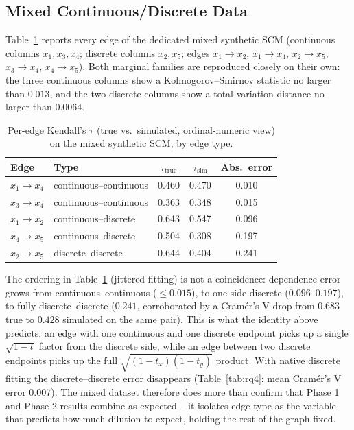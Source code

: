 \documentclass[
  english,
  class=report,
  accentcolor=2c,
  marginpar=false,
  parskip=half-,
  fontsize=11pt,
  ruledheaders=false,
  pdfa=false,
  IMRAD=false,
  thesis={type=master}
]{tudapub}
\begin{document}
\subsection{Mixed Continuous/Discrete Data}
Table~\ref{tab:mixed} reports every edge of the dedicated mixed synthetic
SCM (continuous columns $x_1, x_3, x_4$; discrete columns $x_2, x_5$; edges
$x_1{\to}x_2$, $x_1{\to}x_4$, $x_2{\to}x_5$, $x_3{\to}x_4$, $x_4{\to}x_5$).
Both marginal families are reproduced closely on their own: the three
continuous columns show a Kolmogorov--Smirnov statistic no larger than
$0.013$, and the two discrete columns show a total-variation distance no
larger than $0.0064$.

\begin{table}[ht]
\caption{Per-edge Kendall's $\tau$ (true vs.\ simulated, ordinal-numeric view) on the mixed synthetic SCM, by edge type.}
\label{tab:mixed}
\centering
\begin{tabular}{llccc}
\toprule
\textbf{Edge} & \textbf{Type} & \textbf{$\tau_{\text{true}}$} & \textbf{$\tau_{\text{sim}}$} & \textbf{Abs.\ error} \\
\midrule
$x_1 \to x_4$ & continuous--continuous & 0.460 & 0.470 & 0.010 \\
$x_3 \to x_4$ & continuous--continuous & 0.363 & 0.348 & 0.015 \\
$x_1 \to x_2$ & continuous--discrete   & 0.643 & 0.547 & 0.096 \\
$x_4 \to x_5$ & continuous--discrete   & 0.504 & 0.308 & 0.197 \\
$x_2 \to x_5$ & discrete--discrete     & 0.644 & 0.404 & 0.241 \\
\bottomrule
\end{tabular}
\end{table}

The ordering in Table~\ref{tab:mixed} (jittered fitting) is not a
coincidence: dependence error grows from continuous--continuous ($\le
0.015$), to one-side-discrete ($0.096$--$0.197$), to fully
discrete--discrete ($0.241$, corroborated by a Cram\'er's V drop from
$0.683$ true to $0.428$ simulated on the same pair). This is what the
identity above predicts: an edge with one continuous and one discrete
endpoint picks up a single $\sqrt{1-t}$ factor from the discrete side,
while an edge between two discrete endpoints picks up the full
$\sqrt{(1-t_x)(1-t_y)}$ product. With native discrete fitting the
discrete--discrete error disappears (Table~\ref{tab:rq4}: mean Cram\'er's V
error 0.007). The
mixed dataset therefore does more than confirm that Phase 1 and Phase 2
results combine as expected -- it isolates edge type as the variable that
predicts how much dilution to expect, holding the rest of the graph fixed.
\end{document}
